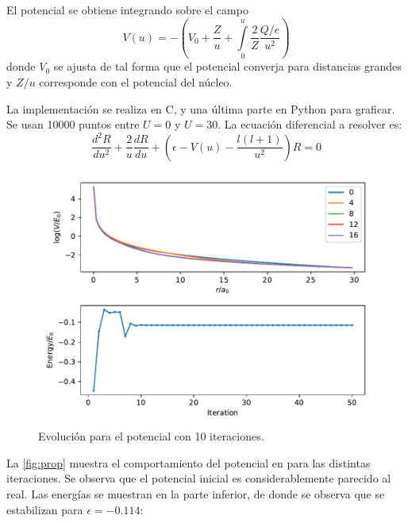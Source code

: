\documentclass[paper=letter, fontsize=11pt]{scrartcl}
\begin{document}
El potencial se obtiene integrando sobre el campo
\begin{equation}
	V(u) = -\left(V_0 + \dfrac{Z}{u} +  \int\limits_{0}^{u}\dfrac{2}{Z}\dfrac{Q/e}{u^2}\right)
\end{equation}
donde $V_0$ se ajusta de tal forma que el potencial converja para distancias grandes y $Z/u$ corresponde con el potencial del n\'ucleo.

La implementaci\'on se realiza en C, y una \'ultima parte en Python para graficar. Se usan 10000 puntos entre $U=0$ y $U=30$. La ecuaci\'on diferencial a resolver es:
\begin{equation}
	\dfrac{d^2R}{du^2} + \dfrac{2}{u}\dfrac{dR}{du} + \left(\epsilon -V(u) - \dfrac{l(l+1)}{u^2}\right)R = 0
\end{equation}


\begin{figure}[!ht]
	\centering
	\includegraphics[width=0.8\linewidth]{change.pdf}
	\caption{Evoluci\'on para el potencial con 10 iteraciones.}
	\label{fig:prop}
\end{figure}

La \autoref{fig:prop} muestra el comportamiento del potencial en para las distintas iteraciones. Se observa que el potencial inicial es considerablemente parecido al real. Las energ\'ias se muestran en la parte inferior, de donde se observa que se estabilizan para $\epsilon=-0.114$:
\end{document}
